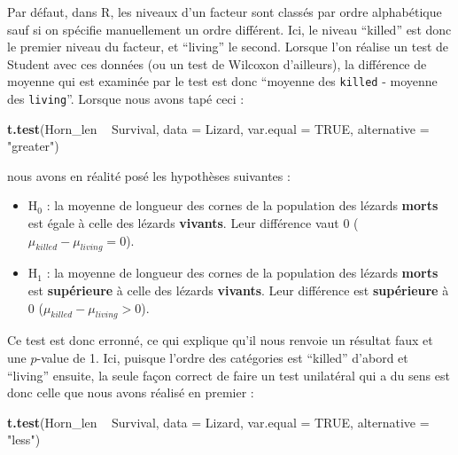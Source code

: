 \documentclass[a4paperpaper,]{article}
\newenvironment{Shaded}{\begin{snugshade}}{\end{snugshade}}
\newcommand{\DataTypeTok}[1]{\textcolor[rgb]{0.00,0.34,0.68}{#1}}
\newcommand{\KeywordTok}[1]{\textcolor[rgb]{0.12,0.11,0.11}{\textbf{#1}}}
\newcommand{\NormalTok}[1]{\textcolor[rgb]{0.12,0.11,0.11}{#1}}
\newcommand{\OperatorTok}[1]{\textcolor[rgb]{0.12,0.11,0.11}{#1}}
\newcommand{\OtherTok}[1]{\textcolor[rgb]{0.00,0.43,0.16}{#1}}
\newcommand{\StringTok}[1]{\textcolor[rgb]{0.75,0.01,0.01}{#1}}
\providecommand{\tightlist}{%
  \setlength{\itemsep}{0pt}\setlength{\parskip}{0pt}}
\begin{document}
Par défaut, dans R, les niveaux d'un facteur sont classés par ordre alphabétique sauf si on spécifie manuellement un ordre différent. Ici, le niveau ``killed'' est donc le premier niveau du facteur, et ``living'' le second. Lorsque l'on réalise un test de Student avec ces données (ou un test de Wilcoxon d'ailleurs), la différence de moyenne qui est examinée par le test est donc ``moyenne des \texttt{killed} - moyenne des \texttt{living}''. Lorsque nous avons tapé ceci :

\begin{Shaded}
\begin{Highlighting}[]
\KeywordTok{t.test}\NormalTok{(Horn_len }\OperatorTok{~}\StringTok{ }\NormalTok{Survival, }
       \DataTypeTok{data =}\NormalTok{ Lizard, }\DataTypeTok{var.equal =} \OtherTok{TRUE}\NormalTok{,}
       \DataTypeTok{alternative =} \StringTok{"greater"}\NormalTok{)}
\end{Highlighting}
\end{Shaded}

nous avons en réalité posé les hypothèses suivantes :

\begin{itemize}
\tightlist
\item
  H\(_0\) : la moyenne de longueur des cornes de la population des lézards \textbf{morts} est égale à celle des lézards \textbf{vivants}. Leur différence vaut 0 (\(\mu_{killed}-\mu_{living} = 0\)).
\item
  H\(_1\) : la moyenne de longueur des cornes de la population des lézards \textbf{morts} est \textbf{supérieure} à celle des lézards \textbf{vivants}. Leur différence est \textbf{supérieure} à 0 (\(\mu_{killed}-\mu_{living} > 0\)).
\end{itemize}

Ce test est donc erronné, ce qui explique qu'il nous renvoie un résultat faux et une \(p\)-value de 1. Ici, puisque l'ordre des catégories est ``killed'' d'abord et ``living'' ensuite, la seule façon correct de faire un test unilatéral qui a du sens est donc celle que nous avons réalisé en premier :

\begin{Shaded}
\begin{Highlighting}[]
\KeywordTok{t.test}\NormalTok{(Horn_len }\OperatorTok{~}\StringTok{ }\NormalTok{Survival, }
       \DataTypeTok{data =}\NormalTok{ Lizard, }\DataTypeTok{var.equal =} \OtherTok{TRUE}\NormalTok{,}
       \DataTypeTok{alternative =} \StringTok{"less"}\NormalTok{)}
\end{Highlighting}
\end{Shaded}
\end{document}
